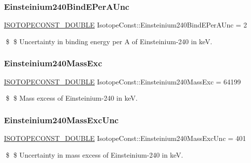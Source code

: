 \subsubsection{\texorpdfstring{Einsteinium240\+Bind\+E\+Per\+A\+Unc}{Einsteinium240BindEPerAUnc}}
{\footnotesize\ttfamily \mbox{\hyperlink{group___isotope_const-_macros_ga8f45a7272ce02c0b4c65c44636ed719a}{I\+S\+O\+T\+O\+P\+E\+C\+O\+N\+S\+T\+\_\+\+D\+O\+U\+B\+LE}} Isotope\+Const\+::\+Einsteinium240\+Bind\+E\+Per\+A\+Unc = 2}

\$ \$ Uncertainty in binding energy per A of Einsteinium-\/240 in keV. \mbox{\label{group___isotope_const-_einsteinium-_es240_gaaaa799184d54b133d6328d9eb0a904ef}} 
\subsubsection{\texorpdfstring{Einsteinium240\+Mass\+Exc}{Einsteinium240MassExc}}
{\footnotesize\ttfamily \mbox{\hyperlink{group___isotope_const-_macros_ga8f45a7272ce02c0b4c65c44636ed719a}{I\+S\+O\+T\+O\+P\+E\+C\+O\+N\+S\+T\+\_\+\+D\+O\+U\+B\+LE}} Isotope\+Const\+::\+Einsteinium240\+Mass\+Exc = 64199}

\$ \$ Mass excess of Einsteinium-\/240 in keV. \mbox{\label{group___isotope_const-_einsteinium-_es240_ga5484f2feda6e4f476a6daf8b5670b678}} 
\subsubsection{\texorpdfstring{Einsteinium240\+Mass\+Exc\+Unc}{Einsteinium240MassExcUnc}}
{\footnotesize\ttfamily \mbox{\hyperlink{group___isotope_const-_macros_ga8f45a7272ce02c0b4c65c44636ed719a}{I\+S\+O\+T\+O\+P\+E\+C\+O\+N\+S\+T\+\_\+\+D\+O\+U\+B\+LE}} Isotope\+Const\+::\+Einsteinium240\+Mass\+Exc\+Unc = 401}

\$ \$ Uncertainty in mass excess of Einsteinium-\/240 in keV. \mbox{\label{group___isotope_const-_einsteinium-_es240_ga3ecd889943a28c6035975a6775426b42}} 

